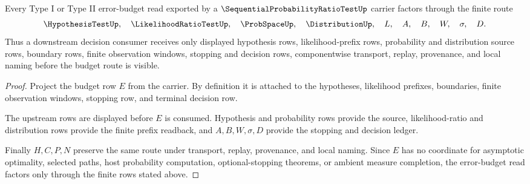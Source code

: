 \begin{theorem}
\label{thm:sequential-probability-ratio-test-error-budget-route}
Every Type I or Type II error-budget read exported by a $\SequentialProbabilityRatioTestUp$ carrier factors through the finite route
$$
\HypothesisTestUp,\quad \LikelihoodRatioTestUp,\quad \ProbSpaceUp,\quad \DistributionUp,\quad L,\quad A,\quad B,\quad W,\quad \sigma,\quad D .
$$
Thus a downstream decision consumer receives only displayed hypothesis rows, likelihood-prefix rows, probability and distribution source rows, boundary rows, finite observation windows, stopping and decision rows, componentwise transport, replay, provenance, and local naming before the budget route is visible.
\end{theorem}
\begin{proof}
Project the budget row $E$ from the carrier. By definition it is attached to the hypotheses, likelihood prefixes, boundaries, finite observation windows, stopping row, and terminal decision row.

The upstream rows are displayed before $E$ is consumed. Hypothesis and probability rows provide the source, likelihood-ratio and distribution rows provide the finite prefix readback, and $A,B,W,\sigma,D$ provide the stopping and decision ledger.

Finally $H,C,P,N$ preserve the same route under transport, replay, provenance, and local naming. Since $E$ has no coordinate for asymptotic optimality, selected paths, host probability computation, optional-stopping theorems, or ambient measure completion, the error-budget read factors only through the finite rows stated above.
\end{proof}


